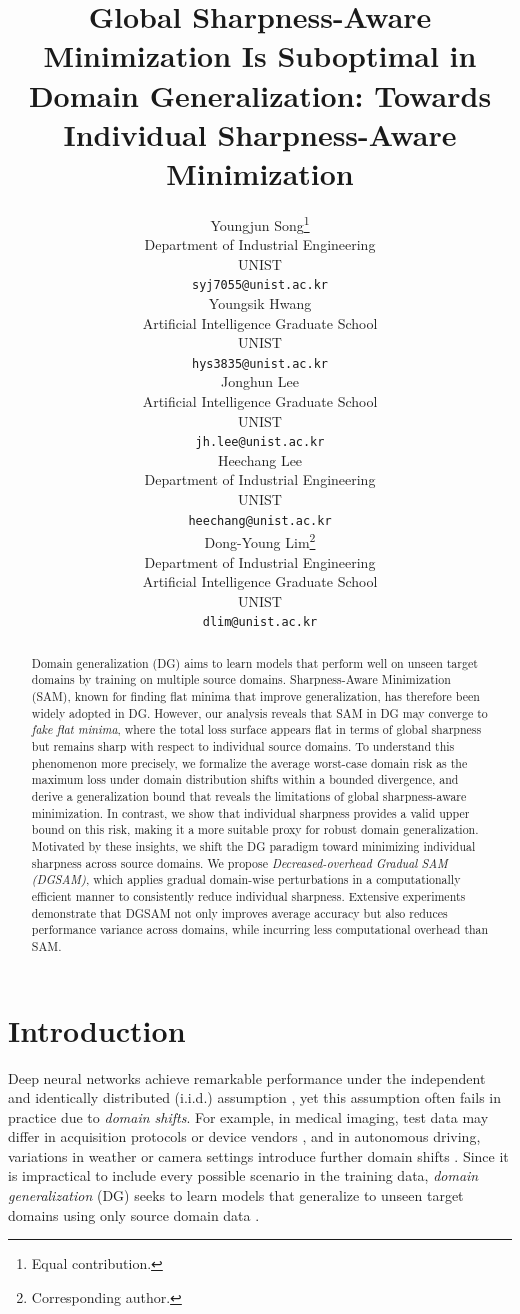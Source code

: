 \documentclass{article}
\title{Global Sharpness-Aware Minimization Is Suboptimal in Domain Generalization: Towards Individual Sharpness-Aware Minimization}
\author{%
    Youngjun Song\thanks{Equal contribution.}\\
    Department of Industrial Engineering\\
    UNIST\\
    \texttt{syj7055@unist.ac.kr}\\
\And
    Youngsik Hwang\footnotemark[1]\\
    Artificial Intelligence Graduate School\\
    UNIST\\ 
    \texttt{hys3835@unist.ac.kr} \\
\And
    Jonghun Lee\\
    Artificial Intelligence Graduate School\\
    UNIST\\ 
    \texttt{jh.lee@unist.ac.kr} \\
\And
    Heechang Lee\\
    Department of Industrial Engineering\\
    UNIST\\
    \texttt{heechang@unist.ac.kr}\\
\And
    Dong-Young Lim\thanks{Corresponding author.}\\
    Department of Industrial Engineering\\
    Artificial Intelligence Graduate School\\
    UNIST\\ 
    \texttt{dlim@unist.ac.kr} \\
}
\theoremstyle{plain}
\theoremstyle{definition}
\theoremstyle{remark}
\begin{document}
\maketitle


\begin{abstract}
Domain generalization (DG) aims to learn models that perform well on unseen target domains by training on multiple source domains.  
Sharpness-Aware Minimization (SAM), known for finding flat minima that improve generalization, has therefore been widely adopted in DG.  
However, our analysis reveals that SAM in DG may converge to \textit{fake flat minima}, where the total loss surface appears flat in terms of global sharpness but remains sharp with respect to individual source domains. To understand this phenomenon more precisely, we formalize the average worst-case domain risk as the maximum loss under domain distribution shifts within a bounded divergence, and derive a generalization bound that reveals the limitations of global sharpness-aware minimization. In contrast, we show that individual sharpness provides a valid upper bound on this risk, making it a more suitable proxy for robust domain generalization. Motivated by these insights, we shift the DG paradigm toward minimizing individual sharpness across source domains. We propose \textit{Decreased-overhead Gradual SAM (DGSAM)}, which applies gradual domain-wise perturbations in a computationally efficient manner to consistently reduce individual sharpness. Extensive experiments demonstrate that DGSAM not only improves average accuracy but also reduces performance variance across domains, while incurring less computational overhead than SAM.

\end{abstract}


\section{Introduction}

Deep neural networks achieve remarkable performance under the independent and identically distributed (i.i.d.) assumption \citep{kawaguchi2017generalizationiid}, yet this assumption often fails in practice due to \textit{domain shifts}. For example, in medical imaging, test data may differ in acquisition protocols or device vendors \citep{li2020medical}, and in autonomous driving, variations in weather or camera settings introduce further domain shifts \citep{khosravian2021selfdriving}. Since it is impractical to include every possible scenario in the training data, \emph{domain generalization} (DG) seeks to learn models that generalize to unseen target domains using only source domain data \citep{muandet2013moment1, arjovsky2019irm, li2018adver1, volpi2018generalizing, li2019meta1}.
\end{document}
